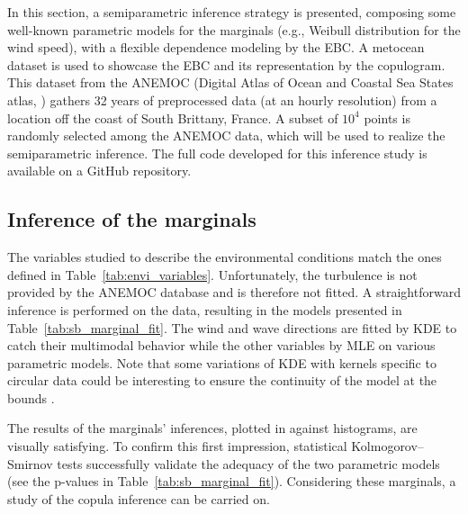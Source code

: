 In this section, a semiparametric inference strategy is presented, composing some well-known parametric models for the marginals (e.g., Weibull distribution for the wind speed), with a flexible dependence modeling by the EBC. 
A metocean dataset is used to showcase the EBC and its representation by the copulogram. 
This dataset from the ANEMOC (Digital Atlas of Ocean and Coastal Sea States atlas, \citealp{raoult_2018_anemoc3}) gathers 32 years of preprocessed data 
(at an hourly resolution) from a location off the coast of South Brittany, France. 
A subset of $10^4$ points is randomly selected among the ANEMOC data, which will be used to realize the semiparametric inference.
The full code developed for this inference study is available on a GitHub repository\footnotemark. 


\subsection{Inference of the marginals}\label{sec:marginal_inference}

The variables studied to describe the environmental conditions match the ones defined in Table~\ref{tab:envi_variables}. 
Unfortunately, the turbulence is not provided by the ANEMOC database and is therefore not fitted. 
A straightforward inference is performed on the data, resulting in the models presented in Table~\ref{tab:sb_marginal_fit}.
The wind and wave directions are fitted by KDE to catch their multimodal behavior while the other variables by MLE on various parametric models. 
Note that some variations of KDE with kernels specific to circular data could be interesting to ensure the continuity of the model at the bounds \citep{bai_1989_directional_kde}. 

The results of the marginals' inferences, plotted in  against histograms, are visually satisfying. 
To confirm this first impression, statistical Kolmogorov–Smirnov tests successfully validate the adequacy of the two parametric models (see the p-values in Table~\ref{tab:sb_marginal_fit}). 
Considering these marginals, a study of the copula inference can be carried on. 

